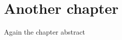 %
% 
\chapter{Another chapter}\label{ch:another}


\begin{chapterabstract}
Again the chapter abstract 
\end{chapterabstract}

\clearpage
